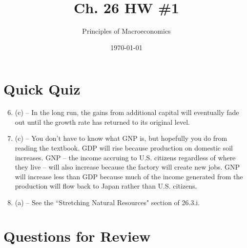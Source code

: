 \documentclass{article}
\title{Ch. 26 HW \#1}
\author{Principles of Macroeconomics}
\date{\today}
\begin{document}
\maketitle

\section*{Quick Quiz}

\begin{enumerate}

\setcounter{enumi}{5}

\item (c) -- In the long run, the gains from additional capital will eventually fade out until the growth rate has returned to its original level.

\item (c) -- You don't have to know what GNP is, but hopefully you do from reading the textbook. GDP will rise because production on domestic soil increases. GNP -- the income accruing to U.S. citizens regardless of where they live -- will also increase because the factory will create new jobs. GNP will increase less than GDP because much of the income generated from the production will flow back to Japan rather than U.S. citizens. 

\item (a) -- See the ``Stretching Natural Resources" section of 26.3.i.

\end{enumerate}

\section*{Questions for Review}
\end{document}
